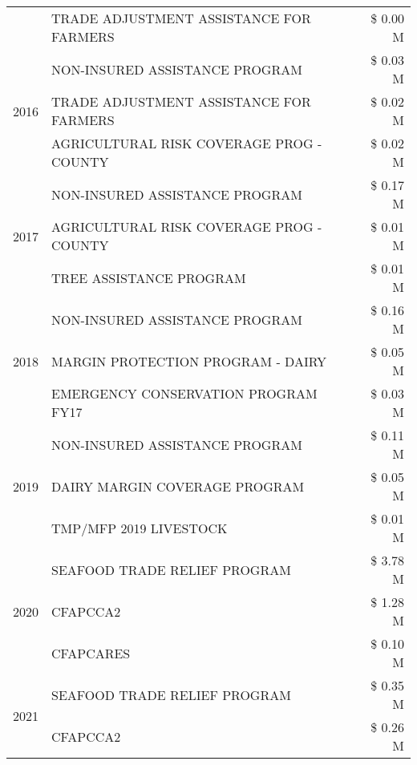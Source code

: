 \begin{tabular}{llr}
 & TRADE ADJUSTMENT ASSISTANCE FOR FARMERS & \$ 0.00 M \\
\cline{1-3}
\multirow[t]{3}{*}{2016} & NON-INSURED ASSISTANCE PROGRAM & \$ 0.03 M \\
 & TRADE ADJUSTMENT ASSISTANCE FOR FARMERS & \$ 0.02 M \\
 & AGRICULTURAL RISK COVERAGE PROG - COUNTY & \$ 0.02 M \\
\cline{1-3}
\multirow[t]{3}{*}{2017} & NON-INSURED ASSISTANCE PROGRAM & \$ 0.17 M \\
 & AGRICULTURAL RISK COVERAGE PROG - COUNTY & \$ 0.01 M \\
 & TREE ASSISTANCE PROGRAM & \$ 0.01 M \\
\cline{1-3}
\multirow[t]{3}{*}{2018} & NON-INSURED ASSISTANCE PROGRAM & \$ 0.16 M \\
 & MARGIN PROTECTION PROGRAM - DAIRY & \$ 0.05 M \\
 & EMERGENCY CONSERVATION PROGRAM FY17 & \$ 0.03 M \\
\cline{1-3}
\multirow[t]{3}{*}{2019} & NON-INSURED ASSISTANCE PROGRAM & \$ 0.11 M \\
 & DAIRY MARGIN COVERAGE PROGRAM & \$ 0.05 M \\
 & TMP/MFP 2019 LIVESTOCK & \$ 0.01 M \\
\cline{1-3}
\multirow[t]{3}{*}{2020} & SEAFOOD TRADE RELIEF PROGRAM & \$ 3.78 M \\
 & CFAPCCA2 & \$ 1.28 M \\
 & CFAPCARES & \$ 0.10 M \\
\cline{1-3}
\multirow[t]{2}{*}{2021} & SEAFOOD TRADE RELIEF PROGRAM & \$ 0.35 M \\
 & CFAPCCA2 & \$ 0.26 M \\
\cline{1-3}
\bottomrule
\end{tabular}
